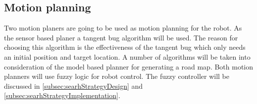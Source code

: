 \documentclass[../Head/Main.tex]{subfiles}
\begin{document}
\subsection{Motion planning}

Two motion planers are going to be used as motion planning for the robot. As the sensor based planer a tangent bug algorithm will be used. The reason for choosing this algorithm is the effectiveness of the tangent bug which only needs an initial position and target location. A number of algorithms will be taken into consideration of the model based planner for generating a road map. Both motion planners will use fuzzy logic for robot control. The fuzzy controller will be discussed in \ref{subsec:searhStrategyDesign} and \ref{subsec:searhStrategyImplementation}.   



\end{document}
